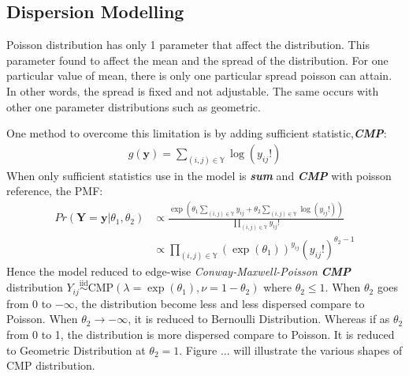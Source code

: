 \documentclass[12pt,a4paper,twoside,openany]{book}
\begin{document}
\subsection{Dispersion Modelling}
Poisson distribution has only 1 parameter that affect the distribution. This parameter found to affect the mean and the spread of the distribution. For one particular value of mean, there is only one particular spread poisson can attain. In other words, the spread is fixed and not adjustable. The same occurs with other one parameter distributions such as geometric.

One method to overcome this limitation is by adding sufficient statistic,\textit{\textbf{CMP}}:
\begin{align}
g(\bm{y}) = \sum_{(i,j) \in \mathbb{Y}} \log(y_{ij}!)
\end{align}
When only sufficient statistics use in the model is \textit{\textbf{sum}} and \textit{\textbf{CMP}} with poisson reference, the PMF:
\begin{align*}
Pr(\bm{Y}=\bm{y}|\theta_1,\theta_2) &\propto \frac{\exp\left(\theta_1 \sum_{(i,j) \in \mathbb{Y}} y_{ij} + \theta_2 \sum_{(i,j) \in \mathbb{Y}} \log(y_{ij}!)\right)}{\prod_{(i,j) \in \mathbb{Y}}y_{ij}!}\\
&\propto \prod_{(i,j) \in \mathbb{Y}} (\exp(\theta_1))^{y_{ij}} (y_{ij}!)^{\theta_2-1}
\end{align*}
Hence the model reduced to edge-wise \textit{Conway-Maxwell-Poisson} \textit{\textbf{CMP}} distribution $Y_{ij}\stackrel{\text{iid}}{\sim}\text{CMP}(\lambda =\exp(\theta_1),\nu = 1-\theta_2)$ where $\theta_2 \le 1$. When $\theta_2$ goes from 0 to $-\infty$, the distribution become less and less dispersed compare to Poisson. When $\theta_2 \to -\infty$, it is reduced to Bernoulli Distribution. Whereas if as $\theta_2$ from 0 to 1, the distribution is more dispersed compare to Poisson. It is reduced  to Geometric Distribution at $\theta_2=1$. Figure ... will illustrate the various shapes of CMP distribution.
\end{document}
